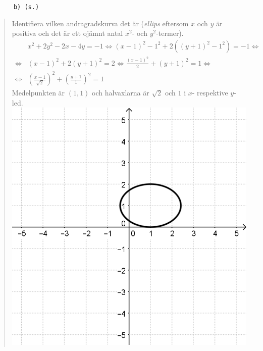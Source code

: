 \documentclass[a4paper]{article}
\newcommand{\tskcol}[1]{\textcolor{tskcol}{#1}}
\begin{document}
	\texttt{\tskcol{~~~~~~b) (s.)}}
	\begin{quotation}
		\noindent
		Identifiera vilken andragradskurva det är (\emph{ellips} eftersom $x$ och $y$ är positiva och det är ett ojämnt antal $x^2$- och $y^2$-termer).
		\begin{align*}
		&x^2+2y^2-2x-4y=-1 \Leftrightarrow
		(x-1)^2-1^2+2((y+1)^2-1^2)=-1 \Leftrightarrow \\ \Leftrightarrow
		&(x-1)^2+2(y+1)^2=2 \Leftrightarrow
		\frac{(x-1)^2}{2}+(y+1)^2=1 \Leftrightarrow \\ \Leftrightarrow
		&\left(\frac{x-1}{\sqrt{2}}\right)^2+\left(\frac{y+1}{1}\right)^2=1
		\end{align*}
		Medelpunkten är $(1,1)$ och halvaxlarna är $\sqrt{2}$ och $1$ i $x$- respektive $y$-led. \\
		\includegraphics[scale=0.2]{images/531b.png}
	\end{quotation}
	
\end{document}

